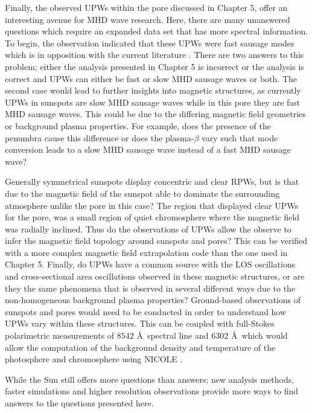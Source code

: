 	Finally, the observed UPWs within the pore discussed in Chapter 5, offer an interesting avenue for MHD wave research.
	Here, there are many unanswered questions which require an expanded data set that has more spectral information.
	To begin, the observation indicated that these UPWs were fast sausage modes which is in opposition with the current literature \citep{Bloomfiel2008,Jess2013}.
	There are two answers to this problem; either the analysis presented in Chapter 5 is incorrect or the analysis is correct and UPWs can either be fast or slow MHD sausage waves or both.
	The second case would lead to further insights into magnetic structures, as currently UPWs in sunspots are slow MHD sausage waves while in this pore they are fast MHD sausage waves.
	This could be due to the differing magnetic field geometries or background plasma properties.
	For example, does the presence of the penumbra cause this difference or does the plasma-$\beta$ vary such that mode conversion leads to a slow MHD sausage wave instead of a fast MHD sausage wave?
	
	Generally symmetrical sunspots display concentric and clear RPWs, but is that due to the magnetic field of the sunspot able to dominate the surrounding atmosphere unlike the pore in this case?
	The region that displayed clear UPWs for the pore, was a small region of quiet chromosphere where the magnetic field was radially inclined.
	Thus do the observations of UPWs allow the observe to infer the magnetic field topology around sunspots and pores?
	This can be verified with a more complex magnetic field extrapolation code than the one used in Chapter 5.
	Finally, do UPWs have a common source with the LOS oscillations and cross-sectional area oscillations observed in these magnetic structures, or are they the same phenomena that is observed in several different ways due to the non-homogeneous background plasma properties?
	Ground-based observations of sunspots and pores would need to be conducted in order to understand how UPWs vary within these structures.
	This can be coupled with full-Stokes polarimetric measurements of  $8542$ \AA\ spectral line and  $6302$ \AA\ which would allow the computation of the background density and temperature of the photosphere and chromosphere using NICOLE \citep{2015A&A...577A...7S,2015ApJ...798..100B}.
	
	While the Sun still offers more questions than answers; new analysis methods, faster simulations and higher resolution observations provide more ways to find answers to the questions presented here.